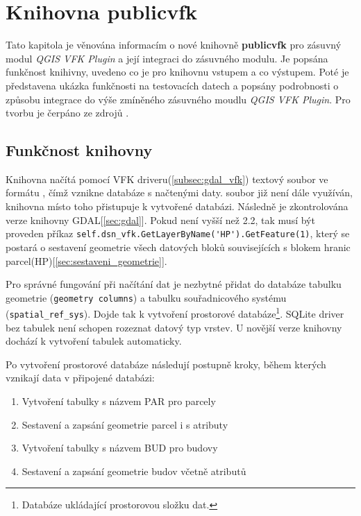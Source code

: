 \chapter{Knihovna publicvfk}
\label{4-plugin}
Tato kapitola je věnována informacím o nové knihovně
\textbf{publicvfk} pro zásuvný modul \textit{QGIS VFK Plugin} a její
integraci do zásuvného modulu. Je popsána funkčnost knihivny, uvedeno
co je pro knihovnu vstupem a co výstupem. Poté je představena ukázka
funkčnosti na testovacích datech a popsány podrobnosti o způsobu
integrace do výše zmíněného zásuvného moudlu \textit{QGIS VFK
  Plugin}. Pro tvorbu je čerpáno ze zdrojů \cite{cookbook,
  ucebnicepython}.

\section{Funkčnost knihovny}
\label{sec:funknost_knihovny}
Knihovna načítá pomocí VFK driveru(\ref{subsec:gdal_vfk}) textový
soubor ve formátu , čímž vznikne  databáze s načtenými
daty.  soubor již není dále využíván, knihovna místo toho
přistupuje k vytvořené  databázi. Následně je zkontrolována
verze knihovny GDAL[\ref{sec:gdal}]. Pokud není vyšší než 2.2, tak
musí být proveden příkaz
\verb|self.dsn_vfk.GetLayerByName('HP').GetFeature(1)|, který se
postará o sestavení geometrie všech datových bloků souvisejících s
blokem hranic parcel(HP)[\ref{sec:sestaveni_geometrie}].

Pro správné fungování při načítání dat je nezbytné přidat do databáze
tabulku geometrie (\verb|geometry columns|) a tabulku souřadnicového
systému (\verb|spatial_ref_sys|). Dojde tak k vytvoření prostorové
databáze\footnote{Databáze ukládající prostorovou složku dat.}. SQLite
driver bez tabulek není schopen rozeznat datový typ vrstev. U novější
verze knihovny dochází k vytvoření tabulek automaticky.

Po vytvoření prostorové databáze následují postupně kroky, během
kterých vznikají data v připojené databázi:
\begin{enumerate}[leftmargin=50pt]
\item Vytvoření tabulky s názvem PAR pro parcely
\item Sestavení a zapsání geometrie parcel i s atributy
\item Vytvoření tabulky s názvem BUD pro budovy
\item Sestavení a zapsání geometrie budov včetně atributů
\end{enumerate}

